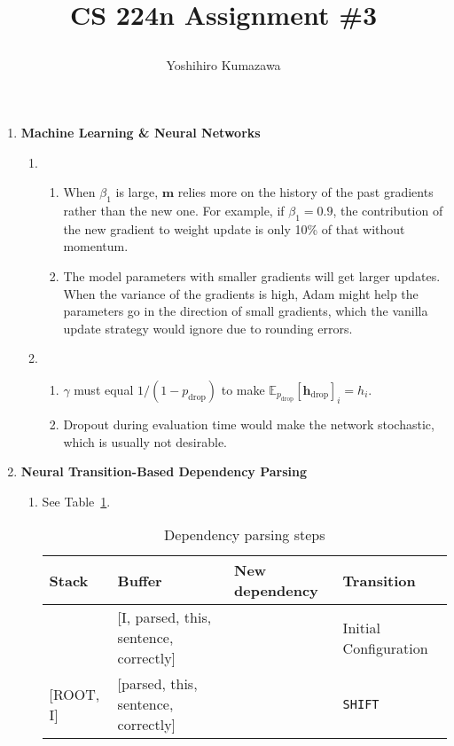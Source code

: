 \documentclass[12pt]{article}
\title{
  \vspace{-2cm}
  CS 224n Assignment \#3 \\
  \author{Yoshihiro Kumazawa}
}
\begin{document}
\maketitle
\begin{enumerate}[label=\textbf{\arabic*.}]
  \item \textbf{Machine Learning \& Neural Networks}
  \begin{enumerate}[label=(\alph*)]
    \item
    \begin{enumerate}[label=\roman*.]
      \item When $\beta_1$ is large, $\bm{m}$ relies more on the history of the past gradients rather than the new one. For example, if $\beta_1=0.9$, the contribution of the new gradient to weight update is only 10\% of that without momentum.
      \item The model parameters with smaller gradients will get larger updates. When the variance of the gradients is high, Adam might help the parameters go in the direction of small gradients, which the vanilla update strategy would ignore due to rounding errors.
    \end{enumerate}
    \item
    \begin{enumerate}[label=\roman*.]
      \item $\gamma$ must equal $1/(1-p_\mathrm{drop})$ to make $\mathbb{E}_{p_\mathrm{drop}}[\bm{h}_\mathrm{drop}]_i=h_i$.
      \item Dropout during evaluation time would make the network stochastic, which is usually not desirable.
    \end{enumerate}
  \end{enumerate}
  \item \textbf{Neural Transition-Based Dependency Parsing}
  \begin{enumerate}[label=(\alph*)]
    \item See Table~\ref{tab:2a}.
    \begin{table}[h]
      \centering
      \caption{Dependency parsing steps} \hfill
      \label{tab:2a}
      \begin{adjustbox}{width=\textwidth}
        \begin{tabular}{l|l|l|l}
          Stack & Buffer & New dependency & Transition \\
          \hline
          [ROOT] & [I, parsed, this, sentence, correctly] &  & Initial Configuration \\
          {[ROOT, I]} & [parsed, this, sentence, correctly] &  & \texttt{SHIFT} \\

\end{tabular}
\end{adjustbox}
\end{table}
\end{enumerate}
\end{enumerate}
\end{document}
